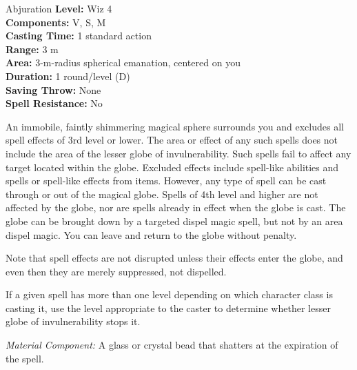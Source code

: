 {Abjuration}
{
	\textbf{Level:}
	Wiz 4\\
	\textbf{Components:}
	V, S, M\\
	\textbf{Casting Time:}
	1 standard action\\
	\textbf{Range:}
	3 m\\
	\textbf{Area:}
	3-m-radius spherical emanation, centered on you\\
	\textbf{Duration:}
	1 round/level (D)\\
	\textbf{Saving Throw:}
	None\\
	\textbf{Spell Resistance:}
	No\\
}
{
	An immobile, faintly shimmering magical sphere surrounds you and excludes all spell effects of 3rd level or lower. The area or effect of any such spells does not include the area of the lesser globe of invulnerability. Such spells fail to affect any target located within the globe. Excluded effects include spell-like abilities and spells or spell-like effects from items. However, any type of spell can be cast through or out of the magical globe. Spells of 4th level and higher are not affected by the globe, nor are spells already in effect when the globe is cast. The globe can be brought down by a targeted dispel magic spell, but not by an area dispel magic. You can leave and return to the globe without penalty.

	Note that spell effects are not disrupted unless their effects enter the globe, and even then they are merely suppressed, not dispelled.

	If a given spell has more than one level depending on which character class is casting it, use the level appropriate to the caster to determine whether lesser globe of invulnerability stops it.

	\textit{Material Component:}
	A glass or crystal bead that shatters at the expiration of the spell.

}
